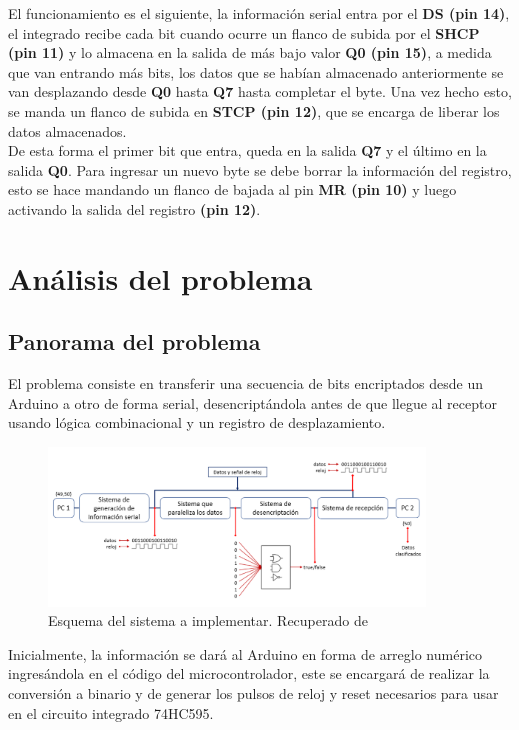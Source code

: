 \documentclass{article}
\begin{document}
El funcionamiento es el siguiente, la información serial entra por el \textbf{DS (pin 14)}, el integrado recibe cada bit cuando ocurre un flanco de subida por el \textbf{SHCP (pin 11)} y lo almacena en la salida de más bajo valor \textbf{Q0 (pin 15)}, a medida que van entrando más bits, los datos que se habían almacenado anteriormente se van desplazando desde \textbf{Q0} hasta \textbf{Q7} hasta completar el byte. Una vez hecho esto, se manda un flanco de subida en \textbf{STCP (pin 12)}, que se encarga de liberar los datos almacenados.\\

\noindent De esta forma el primer bit que entra, queda en la salida \textbf{Q7} y el último en la salida \textbf{Q0}.
Para ingresar un nuevo byte se debe borrar la información del registro, esto se hace mandando un flanco de bajada al pin \textbf{MR (pin 10)} y luego activando la salida del registro \textbf{(pin 12)}.\cite{74hc595datasheet}

\section{Análisis del problema} \label{analisis}

\subsection{Panorama del problema}


El problema consiste en transferir una secuencia de bits encriptados desde un Arduino a otro de forma serial, desencriptándola antes de que llegue al receptor usando lógica combinacional y un registro de desplazamiento.\\

\begin{figure}[!ht]
\includegraphics[width=10cm]{esquema.PNG}
\centering
\caption{Esquema del sistema a implementar. Recuperado de \cite{augusto}}
\end{figure}

Inicialmente, la información se dará al Arduino en forma de arreglo numérico ingresándola en el código del microcontrolador, este se encargará de realizar la conversión a binario y de generar los pulsos de reloj y reset necesarios para usar en el circuito integrado 74HC595.\\
\end{document}
